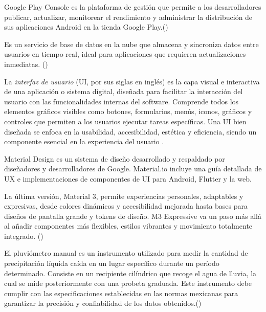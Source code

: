 \begin{definition}
  Google Play Console es la plataforma de gestión que permite a los desarrolladores publicar, actualizar, monitorear el rendimiento y administrar la distribución de sus aplicaciones Android en la tienda Google Play.(\cite{googleplayconsole})


\end{definition}

\begin{definition}
Es un servicio de base de datos en la nube que almacena y sincroniza datos entre usuarios en tiempo real, ideal para aplicaciones que requieren actualizaciones inmediatas. (\cite{firebaserealtime})
\end{definition}

\begin{definition}
  La \textit{interfaz de usuario} (UI, por sus siglas en inglés) es la capa visual e interactiva de una aplicación o sistema digital, diseñada para facilitar la interacción del usuario con las funcionalidades internas del software. Comprende todos los elementos gráficos visibles como botones, formularios, menús, iconos, gráficos y controles que permiten a los usuarios ejecutar tareas específicas. Una UI bien diseñada se enfoca en la usabilidad, accesibilidad, estética y eficiencia, siendo un componente esencial en la experiencia del usuario \cite{shneiderman}.
\end{definition}



\begin{definition}
Material Design es un sistema de diseño desarrollado y respaldado por diseñadores y desarrolladores de Google. Material.io incluye una guía detallada de UX e implementaciones de componentes de UI para Android, Flutter y la web.

La última versión, Material 3, permite experiencias personales, adaptables y expresivas, desde colores dinámicos y accesibilidad mejorada hasta bases para diseños de pantalla grande y tokens de diseño. M3 Expressive va un paso más allá al añadir componentes más flexibles, estilos vibrantes y movimiento totalmente integrado. (\cite{materialdesign2023})
\end{definition}

\begin{definition}

El pluviómetro manual es un instrumento utilizado para medir la cantidad de precipitación líquida caída en un lugar específico durante un período determinado. Consiste en un recipiente cilíndrico que recoge el agua de lluvia, la cual se mide posteriormente con una probeta graduada. Este instrumento debe cumplir con las especificaciones establecidas en las normas mexicanas para garantizar la precisión y confiabilidad de los datos obtenidos.(\cite{semarnat_pluviometro})
\end{definition}


